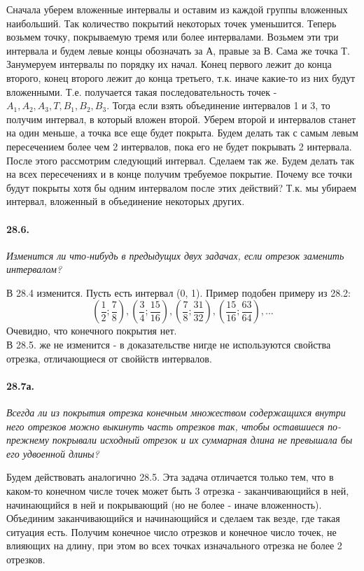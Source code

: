 \documentclass{book}
\begin{document}
Сначала уберем вложенные интервалы и оставим из каждой группы вложенных наибольший. Так количество покрытий некоторых точек уменьшится. Теперь возьмем точку, покрываемую тремя или более интервалами. Возьмем эти три интервала и будем левые концы обозначать за А, правые за В. Сама же точка Т. Занумеруем интервалы по порядку их начал. Конец первого лежит до конца второго, конец второго лежит до конца третьего, т.к. иначе какие-то из них будут вложенными. Т.е. получается такая последовательность точек - $A_1, A_2, A_3, T, B_1, B_2, B_3$. Тогда если взять объединение интервалов 1 и 3, то получим интервал, в который вложен второй. Уберем второй и интервалов станет на один меньше, а точка все еще будет покрыта. Будем делать так с самым левым пересечением более чем 2 интервалов, пока его не будет покрывать 2 интервала. После этого рассмотрим следующий интервал. Сделаем так же. Будем делать так на всех пересечениях и в конце получим требуемое покрытие. Почему все точки будут покрыты хотя бы одним интервалом после этих действий? Т.к. мы убираем интервал, вложенный в объединение некоторых других. 

\paragraph{28.6.}
\textit{Изменится ли что-нибудь в предыдущих двух задачах, если отрезок заменить
интервалом?}

В 28.4 изменится. Пусть есть интервал (0, 1). Пример подобен примеру из 28.2:
\[(\frac{1}{2}; \frac{7}{8}), (\frac{3}{4}; \frac{15}{16}), (\frac{7}{8}; \frac{31}{32}), (\frac{15}{16}; \frac{63}{64}) , ...\] Очевидно, что конечного покрытия нет. \\
В 28.5. же не изменится - в доказательстве нигде не используются свойства отрезка, отличающиеся от своййств интервалов.

\paragraph{28.7а.}
\textit{Всегда ли из покрытия отрезка конечным множеством содержащихся внутри него отрезков можно выкинуть часть отрезков так, чтобы оставшиеся по-прежнему покрывали исходный отрезок и их суммарная длина не превышала бы его удвоенной длины?}

Будем действовать аналогично 28.5. Эта задача отличается только тем, что в каком-то конечном числе точек может быть 3 отрезка - заканчивающийся в ней, начинающийся в ней и покрывающий (но не более - иначе вложенность). Объединим заканчивающийся и начинающийся и сделаем так везде, где такая ситуация есть. Получим конечное число отрезков и конечное число точек, не влияющих на длину, при этом во всех точках изначального отрезка не более 2 отрезков. 
\end{document}
